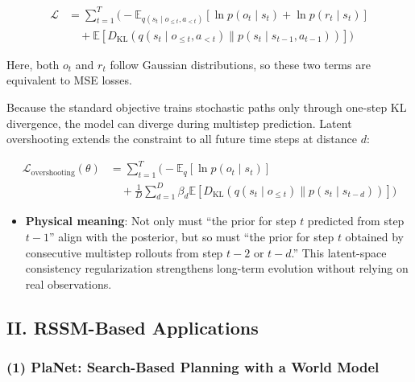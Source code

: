 \[
\begin{aligned}
\mathcal{L}
&=
\sum_{t=1}^{T}
\Biggl(
-\mathbb{E}_{q(s_t \mid o_{\le t}, a_{<t})}
\left[\ln p(o_t \mid s_t) + \ln p(r_t \mid s_t)\right]
\\
&\quad+
\mathbb{E}
\left[
D_{\mathrm{KL}}\left(
q(s_t \mid o_{\le t}, a_{<t})
\parallel
p(s_t \mid s_{t-1}, a_{t-1})
\right)
\right]
\Biggr)
\end{aligned}
\]

Here, both \(o_t\) and \(r_t\) follow Gaussian distributions, so these two terms are equivalent to MSE losses.

Because the standard objective trains stochastic paths only through one-step KL divergence, the model can diverge during multistep prediction. Latent overshooting extends the constraint to all future time steps at distance \(d\):

\[
\begin{aligned}
\mathcal{L}_{\mathrm{overshooting}}(\theta)
&=
\sum_{t=1}^{T}
\Biggl(
-\mathbb{E}_{q}\left[\ln p(o_t \mid s_t)\right]
\\
&\quad+
\frac{1}{D}
\sum_{d=1}^{D}
\beta_d
\mathbb{E}
\left[
D_{\mathrm{KL}}\left(
q(s_t \mid o_{\le t})
\parallel
p(s_t \mid s_{t-d})
\right)
\right]
\Biggr)
\end{aligned}
\]

\begin{itemize}
\tightlist
\item
  \textbf{Physical meaning}: Not only must ``the prior for step \(t\) predicted from step \(t - 1\)'' align with the posterior, but so must ``the prior for step \(t\) obtained by consecutive multistep rollouts from step \(t - 2\) or \(t - d\).'' This latent-space consistency regularization strengthens long-term evolution without relying on real observations.
\end{itemize}

\hypertarget{ii.-rssm-based-applications}{%
\subsection{II. RSSM-Based Applications}\label{ii.-rssm-based-applications}}

\hypertarget{planet-search-based-planning-with-a-world-model}{%
\subsubsection{(1) PlaNet: Search-Based Planning with a World Model}\label{planet-search-based-planning-with-a-world-model}}

